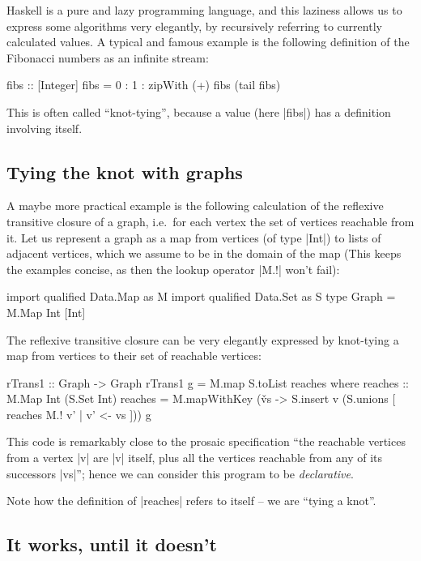 \documentclass[manuscript,screen,acmsmall,nonacm]{acmart}
\begin{document}
Haskell is a pure and lazy programming language, and this laziness allows us to express some algorithms very elegantly, by recursively referring to currently calculated values. A typical and famous example is the following definition of the Fibonacci numbers as an infinite stream:
\begin{code}
fibs :: [Integer]
fibs = 0 : 1 : zipWith (+) fibs (tail fibs)
\end{code}
This is often called “knot-tying”, because a value (here |fibs|) has a definition involving itself.

\subsection{Tying the knot with graphs}

A maybe more practical example is the following calculation of the reflexive transitive closure of a graph, i.e.\ for each vertex the set of vertices reachable from it. Let us represent a graph as a map from vertices (of type |Int|) to lists of adjacent vertices, which we assume to be in the domain of the map (This keeps the examples concise, as then the lookup operator |M.!| won't fail):
\begin{code}
import qualified Data.Map as M
import qualified Data.Set as S
type Graph = M.Map Int [Int]
\end{code}

The reflexive transitive closure can be very elegantly expressed by knot-tying a map from vertices to their set of reachable vertices:
\begin{code}
rTrans1 :: Graph -> Graph
rTrans1 g = M.map S.toList reaches
  where
    reaches :: M.Map Int (S.Set Int)
    reaches = M.mapWithKey (\v vs -> S.insert v (S.unions [ reaches M.! v' | v' <- vs ])) g
\end{code}
This code is remarkably close to the prosaic specification “the reachable vertices from a vertex |v| are |v| itself, plus all the vertices reachable from any of its successors |vs|”; hence we can consider this program to be \emph{declarative}.

Note how the definition of |reaches| refers to itself -- we are “tying a knot”.

\subsection{It works, until it doesn't}
\end{document}
